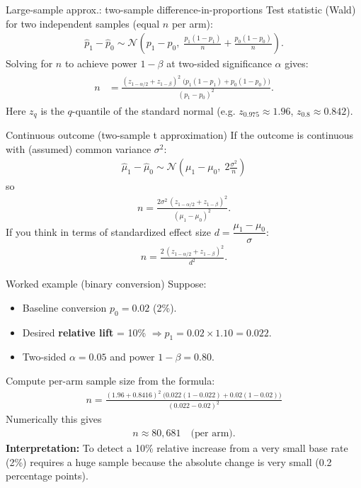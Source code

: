 \documentclass[aspectratio=169,11pt]{beamer}
\begin{document}
\begin{frame}{Large-sample approx.: two-sample difference-in-proportions}
  Test statistic (Wald) for two independent samples (equal $n$ per arm):
  \begin{align*}
    \hat{p}_1 - \hat{p}_0 \sim \mathcal{N}\!\left(p_1-p_0,\; \frac{p_1(1-p_1)}{n} + \frac{p_0(1-p_0)}{n}\right).
  \end{align*}
  Solving for $n$ to achieve power $1-\beta$ at two-sided significance $\alpha$ gives:
  \begin{align*}
  \begin{aligned}
    n &= \frac{(z_{1-\alpha/2} + z_{1-\beta})^2\;\big(p_1(1-p_1)+p_0(1-p_0)\big)}
               {(p_1-p_0)^2}.
  \end{aligned}
  \end{align*}
  Here $z_{q}$ is the $q$-quantile of the standard normal (e.g. $z_{0.975}\approx 1.96$, $z_{0.8}\approx 0.842$).
\end{frame}

\begin{frame}{Continuous outcome (two-sample t approximation)}
  If the outcome is continuous with (assumed) common variance $\sigma^2$:
  \begin{align*}
    \hat{\mu}_1 - \hat{\mu}_0 \sim \mathcal{N}\!\left(\mu_1-\mu_0,\; 2\frac{\sigma^2}{n}\right)
  \end{align*}
  so
  \begin{align*}
    n = \frac{2\sigma^2\,(z_{1-\alpha/2}+z_{1-\beta})^2}{(\mu_1-\mu_0)^2}.
  \end{align*}
  If you think in terms of standardized effect size $d = \dfrac{\mu_1-\mu_0}{\sigma}$:
  \begin{align*}
    n = \frac{2\,(z_{1-\alpha/2}+z_{1-\beta})^2}{d^2}.
  \end{align*}
\end{frame}

\begin{frame}{Worked example (binary conversion)}
  Suppose:
  \begin{itemize}
    \item Baseline conversion $p_0 = 0.02$ (2\%).
    \item Desired \textbf{relative lift} = 10\% $\Rightarrow p_1 = 0.02 \times 1.10 = 0.022$.
    \item Two-sided $\alpha = 0.05$ and power $1-\beta = 0.80$.
  \end{itemize}

  Compute per-arm sample size from the formula:
  \begin{align*}
  n = \frac{(1.96 + 0.8416)^2\;\big(0.022(1-0.022)+0.02(1-0.02)\big)}{(0.022-0.02)^2}
  \end{align*}
  Numerically this gives
  \begin{align*}
    n \approx 80{,}681 \quad\text{(per arm)}.
  \end{align*}
  \vspace{4pt}
  \textbf{Interpretation:} To detect a 10\% relative increase from a very small base rate (2\%) requires a huge sample because the absolute change is very small (0.2 percentage points).
\end{frame}
\end{document}
